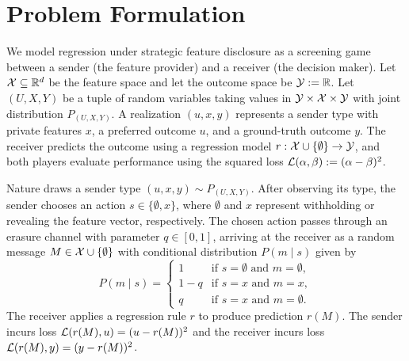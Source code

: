 \section{Problem Formulation}\label{sec:formulation}

We model regression under strategic feature disclosure as a screening game between a sender (the feature provider) and a receiver (the decision maker). Let $\mathcal{X} \subseteq \mathbb{R}^d$ be the feature space and let the outcome space be $\mathcal{Y} := \mathbb{R}$. Let $(U,X,Y)$ be a tuple of random variables taking values in $\mathcal{Y} \times \mathcal{X} \times \mathcal{Y}$ with joint distribution $P_{(U,X,Y)}$. A realization $(u,x,y)$ represents a sender type with private features $x$, a preferred outcome $u$, and a ground-truth outcome $y$. The receiver predicts the outcome using a regression model $r: \mathcal{X} \cup \{\emptyset\} \to \mathcal{Y}$, and both players evaluate performance using the squared loss $\mathcal{L}(\alpha,\beta) := (\alpha-\beta)^2$.

Nature draws a sender type $(u,x,y) \sim P_{(U,X,Y)}$. After observing its type, the sender chooses an action $s \in \{\emptyset, x\}$, where $\emptyset$ and $x$ represent withholding or revealing the feature vector, respectively. The chosen action passes through an erasure channel with parameter $q \in [0,1]$, arriving at the receiver as a random message $M \in \mathcal{X} \cup \{\emptyset\}$ with conditional distribution $P(m \mid s)$ given by
\begin{equation*}
    P(m \mid s) = 
    \begin{cases} 
    1 & \text{if } s = \emptyset \text{ and } m = \emptyset, \\
    1-q & \text{if } s = x \text{ and } m = x, \\
    q & \text{if } s = x \text{ and } m = \emptyset.
    \end{cases}
\end{equation*}
The receiver applies a regression rule $r$ to produce prediction $r(M)$. The sender incurs loss $\mathcal{L}(r(M),u) = (u - r(M))^2$ and the receiver incurs loss $\mathcal{L}(r(M),y) = (y - r(M))^2$.

